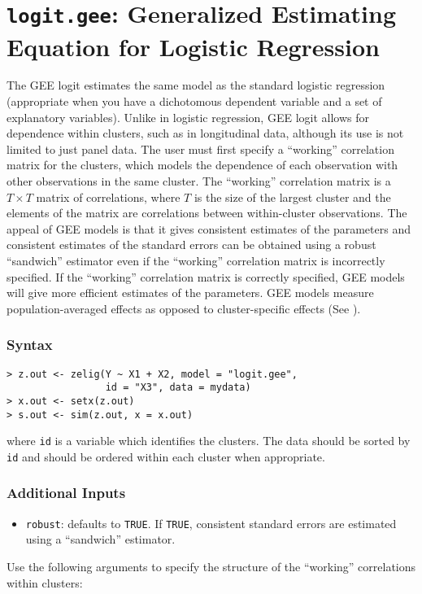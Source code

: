 


\section{\texttt{logit.gee}: Generalized Estimating Equation for Logistic Regression}
\label{logit.gee}

The GEE logit estimates the same model as the standard logistic
regression (appropriate when you have a dichotomous dependent
variable and a set of explanatory variables).  Unlike in logistic
regression, GEE logit allows for dependence within clusters, such as
in longitudinal data, although its use is not limited to just
panel data.  The user must first specify a ``working''
correlation matrix for the clusters, which models the dependence of each observation with other observations in the same cluster.  The ``working'' correlation matrix is a $T \times T$ matrix of correlations, where $T$ is the size of the largest cluster and the elements of the matrix are correlations between within-cluster observations.  The appeal of GEE models is that it gives consistent estimates of the parameters and consistent estimates of
the standard errors can be obtained using a robust ``sandwich''
estimator even if the ``working'' correlation matrix is incorrectly
specified.  If the ``working'' correlation matrix is correctly specified, GEE models will give more efficient estimates of the parameters.  GEE models measure  population-averaged effects as opposed to cluster-specific effects (See \citet{Zorn01}).

\subsubsection{Syntax}

\begin{verbatim}
> z.out <- zelig(Y ~ X1 + X2, model = "logit.gee",
                 id = "X3", data = mydata)
> x.out <- setx(z.out)
> s.out <- sim(z.out, x = x.out)
\end{verbatim}

\noindent where \texttt{id} is a variable which identifies the clusters.  The data should be sorted by \texttt{id} and should be ordered within each cluster when appropriate.

\subsubsection{Additional Inputs}

\begin{itemize}
\item \texttt{robust}: defaults to \texttt{TRUE}.  If \texttt{TRUE}, consistent standard errors are estimated using a ``sandwich'' estimator.
\end{itemize}
Use the following arguments to specify the structure of the ``working'' correlations within clusters:

